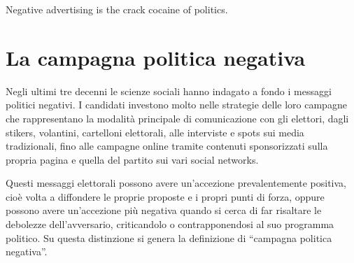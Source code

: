 \begin{savequote}[75mm]
	Negative advertising is the crack cocaine of politics.
\end{savequote}

\chapter{La campagna politica negativa}
\label{chap:negative}

Negli ultimi tre decenni le scienze sociali hanno indagato a fondo i messaggi politici negativi. I candidati investono molto nelle strategie delle loro campagne che rappresentano la modalità principale di comunicazione con gli elettori, dagli stikers, volantini, cartelloni elettorali, alle interviste e spots sui media tradizionali, fino alle campagne online tramite contenuti sponsorizzati sulla propria pagina e quella del partito sui vari social networks.

Questi messaggi elettorali possono avere un'accezione prevalentemente positiva, cioè volta a diffondere le proprie proposte e i propri punti di forza, oppure possono avere un'accezione più negativa quando si cerca di far risaltare le debolezze dell'avversario, criticandolo o contrapponendosi al suo programma politico. Su questa distinzione si genera la definizione di “campagna politica negativa”.


